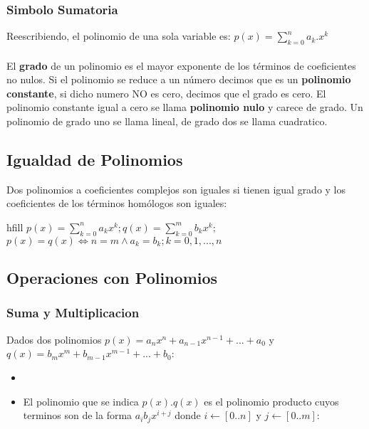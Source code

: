 \documentclass[10pt]{article}
\begin{document}
\subsubsection{Simbolo Sumatoria}
Reescribiendo, el polinomio de una sola variable es: $p(x)=\sum\limits_{k=0}^na_k.x^k$\\ \\
El \textbf{grado} de un polinomio es el mayor exponente de los términos de coeficientes no nulos. Si el polinomio se reduce a un número decimos que es un \textbf{polinomio constante}, si dicho numero NO es cero, decimos que el grado es cero. El polinomio constante igual a cero se llama \textbf{polinomio nulo} y carece de grado. Un polinomio de grado uno se llama lineal, de grado dos se llama cuadratico.
\subsection{Igualdad de Polinomios}
Dos polinomios a coeficientes complejos son iguales si tienen igual grado y los coeficientes de los términos homólogos son iguales:
\begin{center}hfill
$p(x) = \sum\limits_{k=0}^na_kx^k; q(x) = \sum\limits_{k=0}^mb_kx^k;$ \hspace{1cm}
$p(x) = q(x) \iff n=m \land a_k = b_k; k = 0,1,...,n$
\end{center}
\subsection{Operaciones con Polinomios}
\subsubsection{Suma y Multiplicacion}
Dados dos polinomios $p(x)=a_nx^n+a_{n-1}x^{n-1}+...+a_0$ y $q(x)=b_mx^m+b_{m-1}x^{m-1}+...+b_0$:
\begin{itemize}
\item {}
\item El polinomio que se indica $p(x).q(x)$ es el polinomio producto cuyos terminos son de la forma $a_ib_jx^{i+j}$ donde $i\leftarrow[0..n]$ y $j\leftarrow[0..m]$:\\
\end{itemize}
\end{document}
